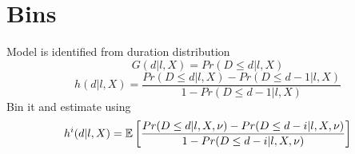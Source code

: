 \documentclass{div}
\begin{document}
\newpage
\section{Bins}

Model is identified from duration distribution
$$ G(d|l, X) = Pr(D \leq d |l, X) $$ 
$$ h(d|l, X) = \frac{Pr(D \leq d |l, X)-Pr(D \leq d-1 |l, X)}{1-Pr(D \leq d-1 |l, X)} $$
Bin it and estimate using 
$$ h^i(d|l, X) = \E\left[\frac{Pr(D \leq d |l, X,\nu)-Pr(D \leq d-i |l, X,\nu)}{1-Pr(D \leq d-i |l, X,\nu)}\right] $$
\end{document}
